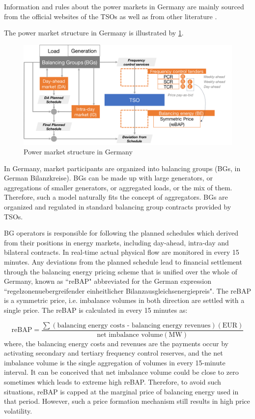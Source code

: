 Information and rules about the power markets in Germany are mainly sourced from the official websites of the TSOs \cite{Hertz_web,Amprion_web,TenneT_web,TransnetBW_web,DE_as_web} as well as from other literature \cite{Moller2010,ConsentecGmbH2014,Wartsila2014}.

The power market structure in Germany is illustrated by \ref{fig:de-market-structure}.

\begin{figure}[h!]
	\centering
	\includegraphics[width=0.95\linewidth]{Figures/DE_market-structure}
	\caption{Power market structure in Germany}
	\label{fig:de-market-structure}
\end{figure}

In Germany, market participants are organized into balancing groups (BGs, in German Bilanzkreise). 
BGs can be made up with large generators, or aggregations of smaller generators, or aggregated loads, or the mix of them. Therefore, such a model naturally fits the concept of aggregators. BGs are organized and regulated in standard balancing group contracts provided by TSOs.

BG operators is responsible for following the planned schedules which derived from their positions in energy markets, including day-ahead, intra-day and bilateral contracts. In real-time actual physical flow are monitored in every 15 minutes. Any deviations from the planned schedule lead to financial settlement through the balancing energy pricing scheme that is unified over the whole of Germany, known as ``reBAP" abbreviated for the German expression ``regelzonenuebergreifender einheitlicher Bilanzausgleichsenergiepreis". The reBAP is a symmetric price, i.e. imbalance volumes in both direction are settled with a single price. The reBAP is calculated in every 15 minutes as:

\begin{equation*}
\text{reBAP} = \frac{\sum \left( \text{balancing energy costs - balancing energy revenues}\right)(\text{EUR})}{\text{net imbalance volume} (\text{MW})}
\end{equation*}
where, the balancing energy costs and revenues are the payments occur by activating secondary and tertiary frequency control reserves, and the net imbalance volume is the single aggregation of volumes in every 15-minute interval. It can be conceived that net imbalance volume could be close to zero sometimes which leads to extreme high reBAP. Therefore, to avoid such situations, reBAP is capped at the marginal price of balancing energy used in that period. However, such a price formation mechanism still results in high price volatility.

